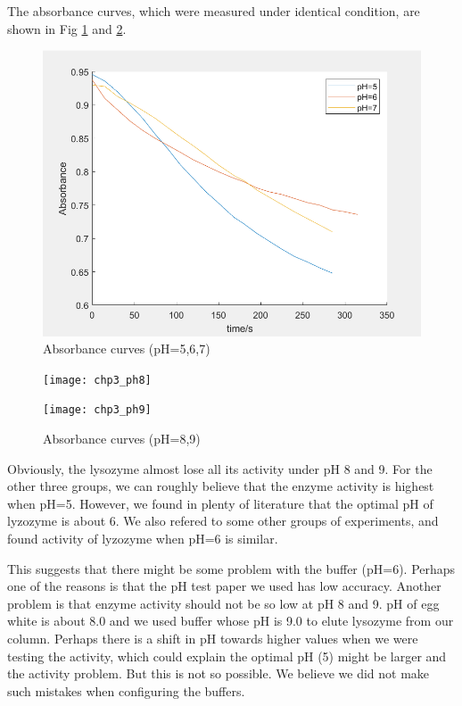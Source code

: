 The absorbance curves, which were measured under identical condition, are shown in Fig \ref{fig:ph} and \ref{fig:ph89}. 
\begin{figure}[!h]
	\centering
	\includegraphics[width=0.9\linewidth]{figures/chp3_ph}
	\caption{Absorbance curves (pH=5,6,7)}
	\label{fig:ph}
\end{figure}

\begin{figure}[!h]
	\centering
	\begin{minipage}[c]{0.45\textwidth}
		\centering
		\texttt{[image: chp3\_ph8]}
	\end{minipage}
	\quad
	\begin{minipage}[c]{0.45\textwidth}
		\centering
		\texttt{[image: chp3\_ph9]}
	\end{minipage}
	\caption{Absorbance curves (pH=8,9)}
	\label{fig:ph89}
\end{figure}


Obviously, the lysozyme almost lose all its activity under pH 8 and 9. For the other three groups, we can roughly believe that the enzyme activity is highest when pH=5. However, we found in plenty of literature \citep{Yu-tong2006,Tian2012} that the optimal pH of lyzozyme is about 6. We also refered to some other groups of experiments, and found activity of lyzozyme when pH=6 is similar. 

This suggests that there might be some problem with the buffer (pH=6). Perhaps one of the reasons is that the pH test paper we used has low accuracy. Another problem is that enzyme activity should not be so low at pH 8 and 9. pH of egg white is about 8.0 and we used buffer whose pH is 9.0 to elute lysozyme from our column. Perhaps there is a shift in pH towards higher values when we were testing the activity, which could explain the optimal pH (5) might be larger and the activity problem. But this is not so possible. We believe we did not make such mistakes when configuring the buffers.

